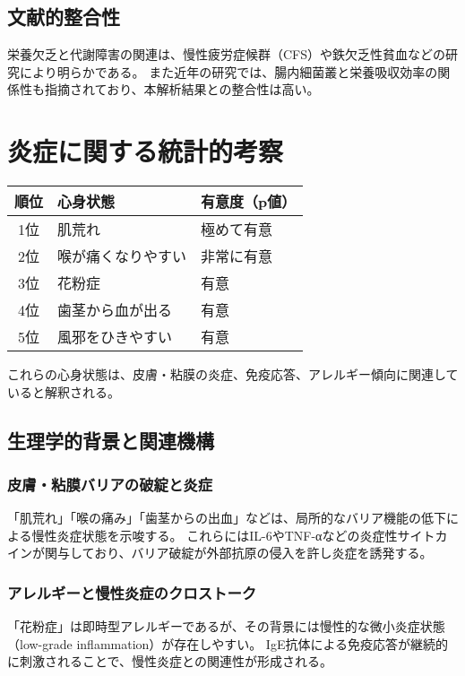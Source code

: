 \documentclass[a4paper,12pt]{article}
\begin{document}
\subsection*{文献的整合性}

栄養欠乏と代謝障害の関連は、慢性疲労症候群（CFS）や鉄欠乏性貧血などの研究により明らかである。  
また近年の研究では、腸内細菌叢と栄養吸収効率の関係性も指摘されており、本解析結果との整合性は高い。


\section{炎症に関する統計的考察}

\begin{table}[H]
\centering
\begin{tabular}{|c|l|l|}
\hline
順位 & 心身状態 & 有意度（p値） \\
\hline
1位 & 肌荒れ & 極めて有意 \\
2位 & 喉が痛くなりやすい & 非常に有意 \\
3位 & 花粉症 & 有意 \\
4位 & 歯茎から血が出る & 有意 \\
5位 & 風邪をひきやすい & 有意 \\
\hline
\end{tabular}
\end{table}

これらの心身状態は、皮膚・粘膜の炎症、免疫応答、アレルギー傾向に関連していると解釈される。

\subsection*{生理学的背景と関連機構}

\subsubsection*{皮膚・粘膜バリアの破綻と炎症}

「肌荒れ」「喉の痛み」「歯茎からの出血」などは、局所的なバリア機能の低下による慢性炎症状態を示唆する。  
これらにはIL-6やTNF-αなどの炎症性サイトカインが関与しており、バリア破綻が外部抗原の侵入を許し炎症を誘発する。

\subsubsection*{アレルギーと慢性炎症のクロストーク}

「花粉症」は即時型アレルギーであるが、その背景には慢性的な微小炎症状態（low-grade inflammation）が存在しやすい。  
IgE抗体による免疫応答が継続的に刺激されることで、慢性炎症との関連性が形成される。
\end{document}
